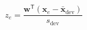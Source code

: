 \par\needspace{88pt}\begin{minipage}{\linewidth}
\begin{equation}z_e=\frac{\mathbf{w}^{\mathsf T}(\mathbf{x}_e-\bar{\mathbf{x}}_{\mathrm{dev}})}{s_{\mathrm{dev}}}\label{eq:4}\end{equation}
\end{minipage}\par
